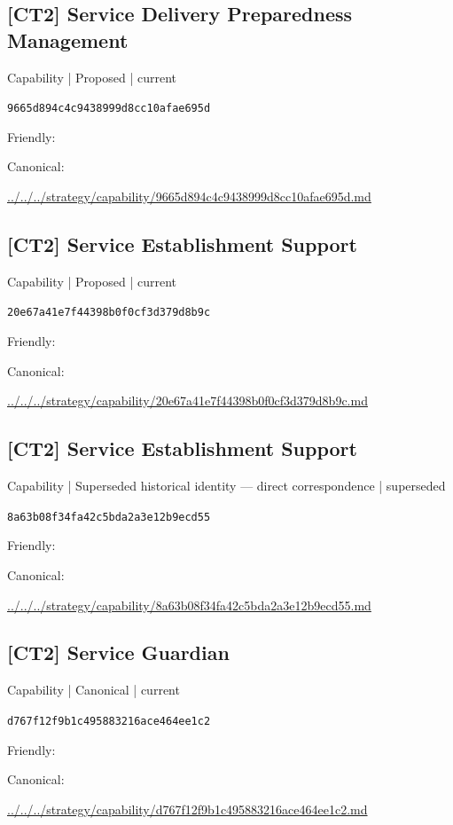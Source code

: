 \documentclass[10pt,a4paper]{article}
\begin{document}
\subsection*{[CT2] Service Delivery Preparedness Management}
{\small Capability | Proposed | current}\par
\texttt{9665d894c4c9438999d8cc10afae695d}\par
Friendly: \par
Canonical: \par
{\footnotesize\url{../../../strategy/capability/9665d894c4c9438999d8cc10afae695d.md}}\par
\subsection*{[CT2] Service Establishment Support}
{\small Capability | Proposed | current}\par
\texttt{20e67a41e7f44398b0f0cf3d379d8b9c}\par
Friendly: \par
Canonical: \par
{\footnotesize\url{../../../strategy/capability/20e67a41e7f44398b0f0cf3d379d8b9c.md}}\par
\subsection*{[CT2] Service Establishment Support}
{\small Capability | Superseded historical identity — direct correspondence | superseded}\par
\texttt{8a63b08f34fa42c5bda2a3e12b9ecd55}\par
Friendly: \par
Canonical: \par
{\footnotesize\url{../../../strategy/capability/8a63b08f34fa42c5bda2a3e12b9ecd55.md}}\par
\subsection*{[CT2] Service Guardian}
{\small Capability | Canonical | current}\par
\texttt{d767f12f9b1c495883216ace464ee1c2}\par
Friendly: \par
Canonical: \par
{\footnotesize\url{../../../strategy/capability/d767f12f9b1c495883216ace464ee1c2.md}}\par
\end{document}
